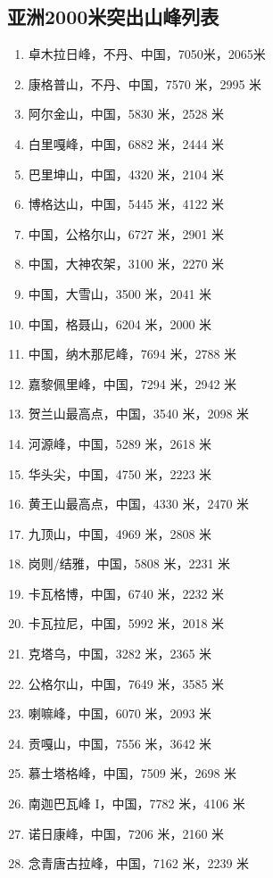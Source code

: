 \documentclass[10pt,twocolumn,letterpaper]{article}
\begin{document}
\subsection{亚洲2000米突出山峰列表}
\begin{flushleft}
\begin{enumerate}
    \item 卓木拉日峰，不丹、中国，7050米，2065米
    \item 康格普山，不丹、中国，7570 米，2995 米
    \item 阿尔金山，中国，5830 米，2528 米
    \item 白里嘎峰，中国，6882 米，2444 米
    \item 巴里坤山，中国，4320 米，2104 米
    \item 博格达山，中国，5445 米，4122 米
    \item 中国，公格尔山，6727 米，2901 米
    \item 中国，大神农架，3100 米，2270 米
    \item 中国，大雪山，3500 米，2041 米
    \item 中国，格聂山，6204 米，2000 米
    \item 中国，纳木那尼峰，7694 米，2788 米
    \item 嘉黎佩里峰，中国，7294 米，2942 米
    \item 贺兰山最高点，中国，3540 米，2098 米
    \item 河源峰，中国，5289 米，2618 米
    \item 华头尖，中国，4750 米，2223 米
    \item 黄王山最高点，中国，4330 米，2470 米
    \item 九顶山，中国，4969 米，2808 米
    \item 岗则/结雅，中国，5808 米，2231 米
    \item 卡瓦格博，中国，6740 米，2232 米
    \item 卡瓦拉尼，中国，5992 米，2018 米
    \item 克塔乌，中国，3282 米，2365 米
    \item 公格尔山，中国，7649 米，3585 米
    \item 喇嘛峰，中国，6070 米，2093 米
    \item 贡嘎山，中国，7556 米，3642 米
    \item 慕士塔格峰，中国，7509 米，2698 米
    \item 南迦巴瓦峰 I，中国，7782 米，4106 米
    \item 诺日康峰，中国，7206 米，2160 米
    \item 念青唐古拉峰，中国，7162 米，2239 米

\end{enumerate}
\end{flushleft}
\end{document}
